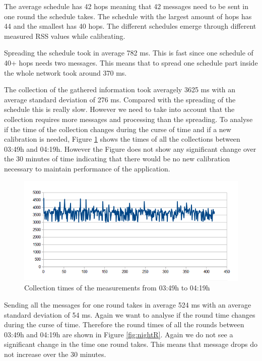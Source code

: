 The average schedule has 42 hops meaning that 42 messages need to be sent in one round the schedule takes. The schedule with the largest amount of hops has 44 and the smallest has 40 hops. The different schedules emerge through different measured RSS values while calibrating.

Spreading the schedule took in average 782 ms. This is fast since one schedule of 40+ hops needs two messages. This means that to spread one schedule part inside the whole network took around 370 ms.

The collection of the gathered information took averagely 3625 ms with an average standard deviation of 276 ms. Compared with the spreading of the schedule this is really slow. However we need to take into account that the collection requires more messages and processing than the spreading. To analyse if the time of the collection changes during the curse of time and if a new calibration is needed, Figure \ref{fig:nightC} shows the times of all the collections between 03:49h and 04:19h. However the Figure does not show any significant change over the 30 minutes of time indicating that there would be no new calibration necessary to maintain performance of the application.

\begin{figure}[htbp]
	\centering         
    \includegraphics[scale=0.75]{content/images/Experiment/NightCollection}
    \caption{Collection times of the measurements from 03:49h to 04:19h}
	\label{fig:nightC}
\end{figure}

Sending all the messages for one round takes in average 524 ms with an average standard deviation of 54 ms. Again we want to analyse if the round time changes during the curse of time. Therefore the round times of all the rounds between 03:49h and 04:19h are shown in Figure \ref{fig:nightR}. Again we do not see a significant change in the time one round takes. This means that message drops do not increase over the 30 minutes.

